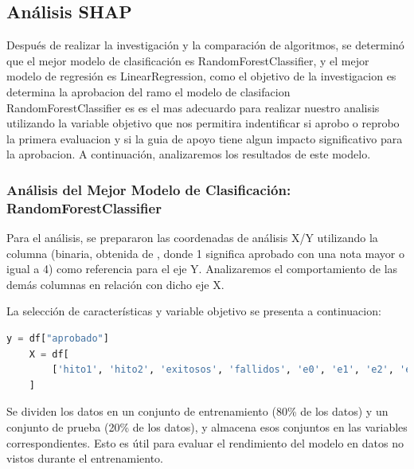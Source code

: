 \subsection{Análisis SHAP}

Después de realizar la investigación y la comparación de algoritmos, se determinó que el mejor modelo de clasificación es RandomForestClassifier, y el mejor modelo de regresión es LinearRegression, como el objetivo de la investigacion es determina la aprobacion del ramo el modelo de clasifacion RandomForestClassifier es es el mas adecuardo para realizar nuestro analisis utilizando la variable objetivo  que nos permitira indentificar si aprobo o reprobo la primera evaluacion y si la guia de apoyo tiene algun impacto significativo para la aprobacion. A continuación, analizaremos los resultados de este modelo.

\subsubsection{Análisis del Mejor Modelo de Clasificación: RandomForestClassifier}


Para el análisis, se prepararon las coordenadas de análisis X/Y utilizando la columna  (binaria, obtenida de , donde 1 significa aprobado con una nota mayor o igual a 4) como referencia para el eje Y. Analizaremos el comportamiento de las demás columnas en relación con dicho eje X.

La selección de características y variable objetivo se presenta a continuacion:

\begin{lstlisting}[language=Python, caption=Selección de características y variable objetivo RandomForestClassifier, label=lst:seleccion_caracteristicasRFC]
    y = df["aprobado"]
    X = df[
        ['hito1', 'hito2', 'exitosos', 'fallidos', 'e0', 'e1', 'e2', 'e3', 'e4', 'e5', 'e6', 'e7', 'e8', 'e9', 'e10', 'e11', 'e12', 'e13', 'e14', 'e15', 'e16', 'e17', 'e18', 'e19', 'e20', 'e21', 'e22', 'e23', 'e24', 'e25', 'e26', 'e27', 'e28', 'e29', 'e30', 'e31', 'e32', 'e33', 'e34', 'e35', 'e36', 'e37', 'e38', 'e39', 'e40', 'e41', 'e42', 'e43', 'e44', 'e45', 'e46', 'e47', 'e48', 'e49', 'e50', 'e51', 'e52']
    ]
\end{lstlisting}

Se dividen los datos en un conjunto de entrenamiento (80\% de los datos) y un conjunto de prueba (20\% de los datos), y almacena esos conjuntos en las variables correspondientes. Esto es útil para evaluar el rendimiento del modelo en datos no vistos durante el entrenamiento.

